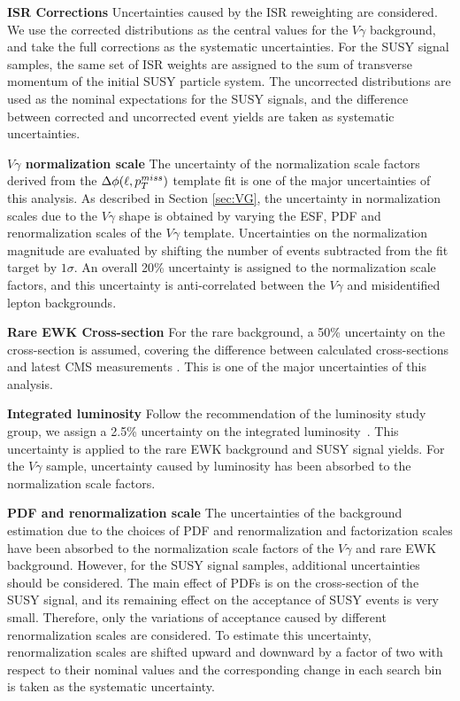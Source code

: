 \documentclass[thesis.tex]{subfiles}
\renewcommand\_{\textunderscore\allowbreak}
\begin{document}
\noindent \textbf{ISR Corrections} 
\quad Uncertainties caused by the ISR reweighting are considered. 
We use the corrected distributions as the central values for the $V\gamma$ background, and take the full corrections as the systematic uncertainties.
For the SUSY signal samples, the same set of ISR weights are assigned to the sum of transverse momentum of the initial SUSY particle system. 
The uncorrected distributions are used as the nominal expectations for the SUSY signals, and the difference between corrected and uncorrected event yields are taken as systematic uncertainties. 

\noindent \textbf{$V\gamma$ normalization scale}
\quad The uncertainty of the normalization scale factors derived from the $\Delta\phi(\ell, p_T^{miss})$ template fit is one of the major uncertainties of this analysis. 
As described in Section \ref{sec:VG}, the uncertainty in normalization scales due to the $V\gamma$ shape is obtained by varying the ESF, PDF and renormalization scales of the $V\gamma$ template. 
Uncertainties on the normalization magnitude are evaluated by shifting the number of events subtracted from the fit target by $1\sigma$. 
An overall 20\% uncertainty is assigned to the normalization scale factors, and this uncertainty is anti-correlated between the $V\gamma$ and misidentified lepton backgrounds. 

\noindent \textbf{Rare EWK Cross-section}
\quad For the rare background, a 50\% uncertainty on the cross-section is assumed, covering the difference between calculated cross-sections and latest CMS measurements \cite{CMS:ttgxs,CMS:ttxs}. 
This is one of the major uncertainties of this analysis. 

\noindent \textbf{Integrated luminosity}
\quad Follow the recommendation of the luminosity study group, we assign a 2.5\% uncertainty on the integrated luminosity~\cite{CMS-PAS-LUM-17-001}. 
This uncertainty is applied to the rare EWK background and SUSY signal yields. 
For the $V\gamma$ sample, uncertainty caused by luminosity has been absorbed to the normalization scale factors.

\noindent \textbf{PDF and renormalization scale} 
\quad The uncertainties of the background estimation due to the choices of PDF and renormalization and factorization scales have been absorbed to the normalization scale factors of the $V\gamma$ and rare EWK background.
However, for the SUSY signal samples, additional uncertainties should be considered. 
The main effect of PDFs is on the cross-section of the SUSY signal, and its remaining effect on the acceptance of SUSY events is very small. 
Therefore, only the variations of acceptance caused by different renormalization scales are considered. 
To estimate this uncertainty, renormalization scales are shifted upward and downward by a factor of two with respect to their nominal values and the corresponding change in each search bin is taken as the systematic uncertainty. 
\end{document}
